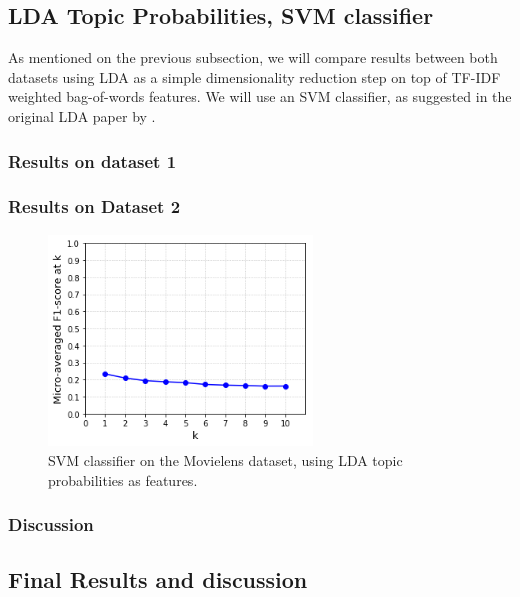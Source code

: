 \subsection{LDA Topic Probabilities, SVM classifier}

As mentioned on the previous subsection, we will compare results between both datasets using LDA as a simple dimensionality reduction step on top of TF-IDF weighted bag-of-words features. We will use an SVM classifier, as suggested in the original LDA paper by \cite{blei_etal_2003}.

\subsubsection{Results on dataset 1}

\subsubsection{Results on Dataset 2}

\begin{figure}[H]
    \centering
    \includegraphics[width=7cm]{chapters/05_experiments/images/svm-lda-tf-idf-movielens.png}
    \caption{SVM classifier on the Movielens dataset, using LDA topic probabilities as features.}
    \label{fig:svm_lda_movielens}
\end{figure}

\subsubsection{Discussion}

\subsection{Final Results and discussion}


